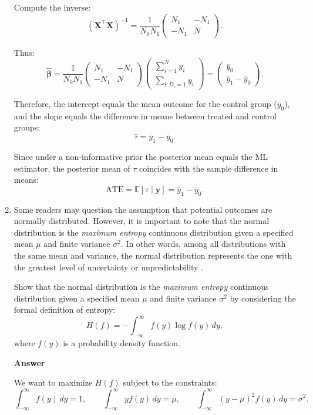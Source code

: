 \begin{enumerate}[leftmargin=*]
Compute the inverse:
\[
(\mathbf{X}^\top \mathbf{X})^{-1} =
\frac{1}{N_0 N_1}
\begin{pmatrix}
	N_1 & -N_1 \\
	-N_1 & N
\end{pmatrix}.
\]

Thus:
\[
\widehat{\boldsymbol{\beta}} =
\frac{1}{N_0 N_1}
\begin{pmatrix}
	N_1 & -N_1 \\
	-N_1 & N
\end{pmatrix}
\begin{pmatrix}
	\sum_{i=1}^N y_i \\
	\sum_{i:D_i=1} y_i
\end{pmatrix}
=
\begin{pmatrix}
	\bar{y}_0 \\
	\bar{y}_1 - \bar{y}_0
\end{pmatrix}.
\]

Therefore, the intercept equals the mean outcome for the control group ($\bar{y}_0$), and the slope equals the difference in means between treated and control groups:
\[
\widehat{\tau} = \bar{y}_1 - \bar{y}_0.
\]

Since under a non-informative prior the posterior mean equals the ML estimator, the posterior mean of $\tau$ coincides with the sample difference in means:
\[
\text{ATE} = \mathbb{E}[\tau \mid \mathbf{y}] = \bar{y}_1 - \bar{y}_0.
\]

\item Some readers may question the assumption that potential outcomes are normally distributed. However, it is important to note that the normal distribution is the \textit{maximum entropy} continuous distribution given a specified mean $\mu$ and finite variance $\sigma^2$. In other words, among all distributions with the same mean and variance, the normal distribution represents the one with the greatest level of uncertainty or unpredictability \cite{cover2006elements}.
 
Show that the normal distribution is the \textit{maximum entropy} continuous distribution given a specified mean $\mu$ and finite variance $\sigma^2$ by considering the formal definition of entropy:
\[
H(f) = - \int_{-\infty}^{\infty} f(y) \log f(y) \, dy,
\]
where $f(y)$ is a probability density function.

\textbf{Answer}
  
We want to maximize $H(f)$ subject to the constraints:
\[
\int_{-\infty}^{\infty} f(y)\, dy = 1, \qquad
\int_{-\infty}^{\infty} y f(y)\, dy = \mu, \qquad
\int_{-\infty}^{\infty} (y-\mu)^2 f(y)\, dy = \sigma^2.
\]


\end{enumerate}

